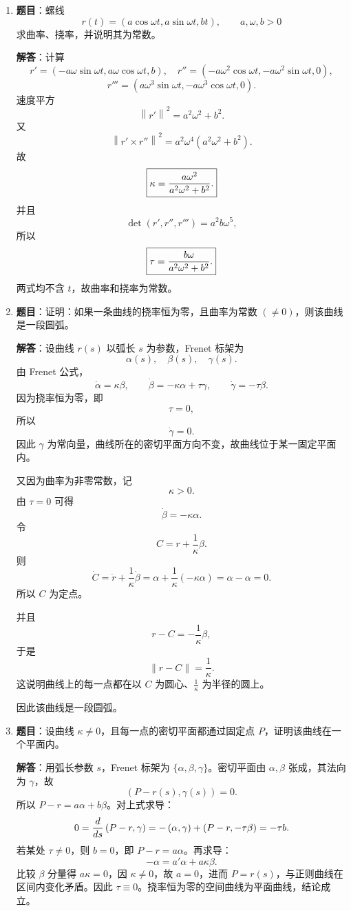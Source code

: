 \documentclass[UTF8,12pt,a4paper]{ctexart}
\newcommand{\norm}[1]{\left\lVert #1\right\rVert}
\newcommand{\inner}[2]{\left(#1,#2\right)}
\begin{document}
\begin{enumerate}
\item \textbf{题目}：螺线
\[
r(t)=(a\cos\omega t,a\sin\omega t,bt),\qquad a,\omega,b>0
\]
求曲率、挠率，并说明其为常数。

\textbf{解答}：计算
\[
r'=(-a\omega\sin\omega t,a\omega\cos\omega t,b),\quad
r''=(-a\omega^2\cos\omega t,-a\omega^2\sin\omega t,0),
\]
\[
r'''=(a\omega^3\sin\omega t,-a\omega^3\cos\omega t,0).
\]
速度平方
\[
\norm{r'}^2=a^2\omega^2+b^2.
\]
又
\[
\norm{r'\times r''}^2=a^2\omega^4(a^2\omega^2+b^2).
\]
故
\[
\boxed{\kappa={a\omega^2\over a^2\omega^2+b^2}.}
\]
并且
\[
\det(r',r'',r''')=a^2b\omega^5,
\]
所以
\[
\boxed{\tau={b\omega\over a^2\omega^2+b^2}.}
\]
两式均不含 $t$，故曲率和挠率为常数。

\item \textbf{题目}：证明：如果一条曲线的挠率恒为零，且曲率为常数 $(\neq 0)$，则该曲线是一段圆弧。

\textbf{解答}：设曲线 $r(s)$ 以弧长 $s$ 为参数，Frenet 标架为
\[
\alpha(s),\quad \beta(s),\quad \gamma(s).
\]
由 Frenet 公式，
\[
\dot\alpha=\kappa\beta,\qquad
\dot\beta=-\kappa\alpha+\tau\gamma,\qquad
\dot\gamma=-\tau\beta.
\]
因为挠率恒为零，即
\[
\tau=0,
\]
所以
\[
\dot\gamma=0.
\]
因此 $\gamma$ 为常向量，曲线所在的密切平面方向不变，故曲线位于某一固定平面内。

又因为曲率为非零常数，记
\[
\kappa>0.
\]
由 $\tau=0$ 可得
\[
\dot\beta=-\kappa\alpha.
\]
令
\[
C=r+\frac{1}{\kappa}\beta.
\]
则
\[
\dot C=\dot r+\frac{1}{\kappa}\dot\beta
=\alpha+\frac{1}{\kappa}(-\kappa\alpha)
=\alpha-\alpha=0.
\]
所以 $C$ 为定点。

并且
\[
r-C=-\frac{1}{\kappa}\beta,
\]
于是
\[
\|r-C\|=\frac{1}{\kappa}.
\]
这说明曲线上的每一点都在以 $C$ 为圆心、$\frac{1}{\kappa}$ 为半径的圆上。

因此该曲线是一段圆弧。

\item \textbf{题目}：设曲线 $\kappa\ne0$，且每一点的密切平面都通过固定点 $P$，证明该曲线在一个平面内。

\textbf{解答}：用弧长参数 $s$，Frenet 标架为 $\{\alpha,\beta,\gamma\}$。密切平面由 $\alpha,\beta$ 张成，其法向为 $\gamma$，故
\[
\inner{P-r(s)}{\gamma(s)}=0.
\]
所以 $P-r=a\alpha+b\beta$。对上式求导：
\[
0={d\over ds}\inner{P-r}{\gamma}
=-\inner{\alpha}{\gamma}+\inner{P-r}{-\tau\beta}
=-\tau b.
\]
若某处 $\tau\ne0$，则 $b=0$，即 $P-r=a\alpha$。再求导：
\[
-\alpha=a'\alpha+a\kappa\beta.
\]
比较 $\beta$ 分量得 $a\kappa=0$，因 $\kappa\ne0$，故 $a=0$，进而 $P=r(s)$，与正则曲线在区间内变化矛盾。因此 $\tau\equiv0$。挠率恒为零的空间曲线为平面曲线，结论成立。


\end{enumerate}
\end{document}
